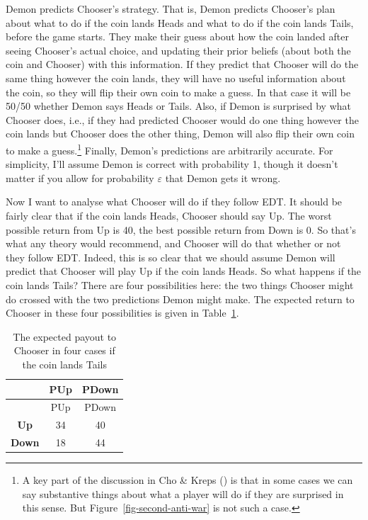\documentclass[
  12pt,
  letterpaper,
  DIV=11,
  numbers=noendperiod]{scrreprt}
\begin{document}
Demon predicts Chooser's strategy. That is, Demon predicts Chooser's
plan about what to do if the coin lands Heads and what to do if the coin
lands Tails, before the game starts. They make their guess about how the
coin landed after seeing Chooser's actual choice, and updating their
prior beliefs (about both the coin and Chooser) with this information.
If they predict that Chooser will do the same thing however the coin
lands, they will have no useful information about the coin, so they will
flip their own coin to make a guess. In that case it will be 50/50
whether Demon says Heads or Tails. Also, if Demon is surprised by what
Chooser does, i.e., if they had predicted Chooser would do one thing
however the coin lands but Chooser does the other thing, Demon will also
flip their own coin to make a guess.\footnote{A key part of the
  discussion in Cho \& Kreps () is that
  in some cases we can say substantive things about what a player will
  do if they are surprised in this sense. But
  Figure~\ref{fig-second-anti-war} is not such a case.} Finally, Demon's
predictions are arbitrarily accurate. For simplicity, I'll assume Demon
is correct with probability 1, though it doesn't matter if you allow for
probability \(\varepsilon\) that Demon gets it wrong.

Now I want to analyse what Chooser will do if they follow EDT. It should
be fairly clear that if the coin lands Heads, Chooser should say Up. The
worst possible return from Up is 40, the best possible return from Down
is 0. So that's what any theory would recommend, and Chooser will do
that whether or not they follow EDT. Indeed, this is so clear that we
should assume Demon will predict that Chooser will play Up if the coin
lands Heads. So what happens if the coin lands Tails? There are four
possibilities here: the two things Chooser might do crossed with the two
predictions Demon might make. The expected return to Chooser in these
four possibilities is given in Table~\ref{tbl-payout-if-tails}.

\begin{longtable}[]{@{}ccc@{}}
\caption{The expected payout to Chooser in four cases if the coin lands
Tails}\label{tbl-payout-if-tails}\tabularnewline
\toprule\noalign{}
& PUp & PDown \\
\midrule\noalign{}
\endfirsthead
\toprule\noalign{}
& PUp & PDown \\
\midrule\noalign{}
\endhead
\bottomrule\noalign{}
\endlastfoot
\textbf{Up} & 34 & 40 \\
\textbf{Down} & 18 & 44 \\
\end{longtable}
\end{document}
